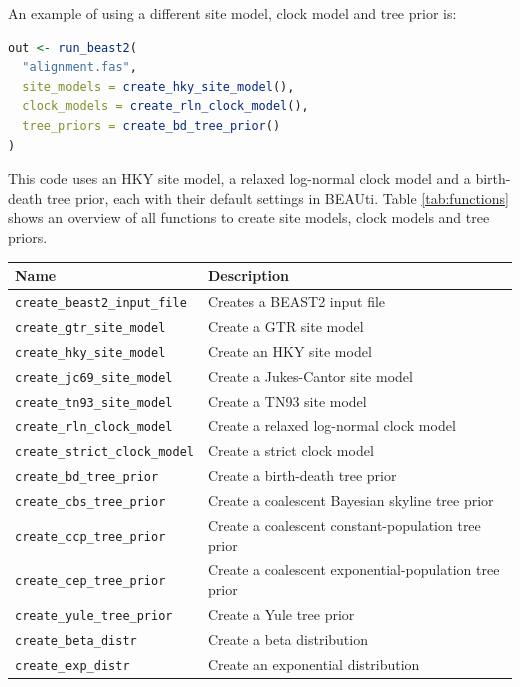 \documentclass{article}
\begin{document}
An example of using a different site model, clock model 
and tree prior is:

\begin{lstlisting}[language=R, caption=Example with different site model and clock model and tree prior, label=lst:all_different, floatplacement=H]
out <- run_beast2(
  "alignment.fas",
  site_models = create_hky_site_model(),
  clock_models = create_rln_clock_model(),
  tree_priors = create_bd_tree_prior()
)
\end{lstlisting}

This code uses an HKY site model, a relaxed log-normal clock model and a 
birth-death tree prior, each with their default settings in BEAUti.
Table \ref{tab:functions} shows an overview of all functions to 
create site models, clock models and tree priors.

\begin{table}[]
\centering
\begin{tabular}{ | l | l | }
\hline
\textbf{Name} & \textbf{Description} \\
\hline
\verb;create_beast2_input_file; & Creates a BEAST2 input file \\
\hline
\verb;create_gtr_site_model; & Create a GTR site model \\
\verb;create_hky_site_model; & Create an HKY site model \\
\verb;create_jc69_site_model; & Create a Jukes-Cantor site model \\
\verb;create_tn93_site_model; & Create a TN93 site model \\
\hline
\verb;create_rln_clock_model; & Create a relaxed log-normal clock model \\
\verb;create_strict_clock_model; & Create a strict clock model \\
\hline
\verb;create_bd_tree_prior; & Create a birth-death tree prior \\
\verb;create_cbs_tree_prior; & Create a coalescent Bayesian skyline tree prior \\
\verb;create_ccp_tree_prior; & Create a coalescent constant-population tree prior \\
\verb;create_cep_tree_prior; & Create a coalescent exponential-population tree prior \\
\verb;create_yule_tree_prior; & Create a Yule tree prior \\
\hline
\verb;create_beta_distr; & Create a beta distribution \\
\verb;create_exp_distr; & Create an exponential distribution \\

\end{tabular}
\end{table}
\end{document}
